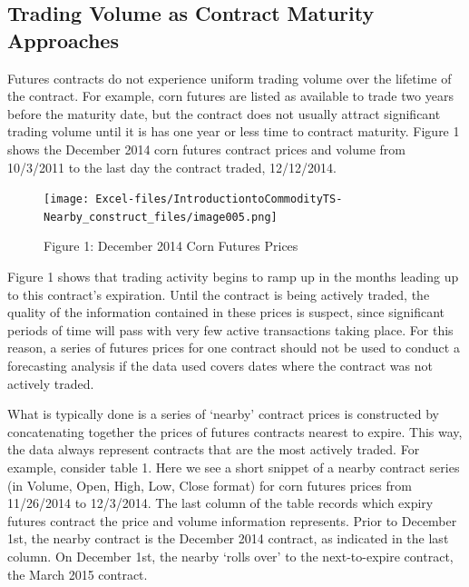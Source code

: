 \documentclass[
  letterpaper,
  DIV=11,
  numbers=noendperiod]{scrreprt}
\begin{document}
\hypertarget{trading-volume-as-contract-maturity-approaches}{%
\subsection{Trading Volume as Contract Maturity
Approaches}\label{trading-volume-as-contract-maturity-approaches}}

Futures contracts do not experience uniform trading volume over the
lifetime of the contract. For example, corn futures are listed as
available to trade two years before the maturity date, but the contract
does not usually attract significant trading volume until it is has one
year or less time to contract maturity. Figure 1 shows the December 2014
corn futures contract prices and volume from 10/3/2011 to the last day
the contract traded, 12/12/2014.

\begin{figure}

{\centering \texttt{[image: Excel-files/IntroductiontoCommodityTS-Nearby\_construct\_files/image005.png]}

}

\caption{Figure 1: December 2014 Corn Futures Prices}

\end{figure}

Figure 1 shows that trading activity begins to ramp up in the months
leading up to this contract's expiration. Until the contract is being
actively traded, the quality of the information contained in these
prices is suspect, since significant periods of time will pass with very
few active transactions taking place. For this reason, a series of
futures prices for one contract should not be used to conduct a
forecasting analysis if the data used covers dates where the contract
was not actively traded.

What is typically done is a series of `nearby' contract prices is
constructed by concatenating together the prices of futures contracts
nearest to expire. This way, the data always represent contracts that
are the most actively traded. For example, consider table 1. Here we see
a short snippet of a nearby contract series (in Volume, Open, High, Low,
Close format) for corn futures prices from 11/26/2014 to 12/3/2014. The
last column of the table records which expiry futures contract the price
and volume information represents. Prior to December 1st, the nearby
contract is the December 2014 contract, as indicated in the last column.
On December 1st, the nearby `rolls over' to the next-to-expire contract,
the March 2015 contract.
\end{document}
